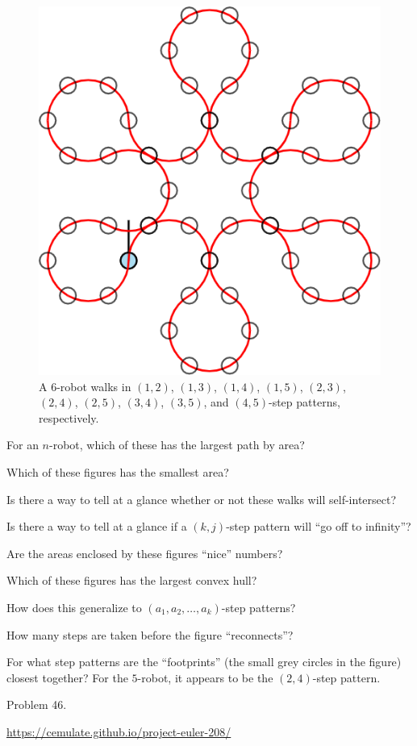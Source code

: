 \documentclass{article}
\begin{document}
\begin{figure}[ht!]
  \includegraphics[scale=0.12]{assets/robot_walks/079_problem_6-robot_4_5.png}
  \caption{
    A $6$-robot walks in $(1,2)$, $(1,3)$, $(1,4)$, $(1,5)$, $(2,3)$,
    $(2,4)$, $(2,5)$, $(3,4)$, $(3,5)$, and $(4,5)$-step patterns, respectively.
  }
\end{figure}
\begin{question}
  For an $n$-robot, which of these has the largest path by area?
\end{question}

\begin{related}
  \item Which of these figures has the smallest area?
  \item Is there a way to tell at a glance whether or not these walks will
    self-intersect?
  \item Is there a way to tell at a glance if a $(k,j)$-step pattern will
    ``go off to infinity''?
  \item Are the areas enclosed by these figures ``nice'' numbers?
  \item Which of these figures has the largest convex hull?
  \item How does this generalize to $(a_1, a_2, \hdots, a_k)$-step patterns?
  \item How many steps are taken before the figure ``reconnects''?
  \item For what step patterns are the ``footprints''
    (the small grey circles in the figure) closest together?
    For the $5$-robot, it appears to be the $(2, 4)$-step pattern.
\end{related}
\begin{references}
  \item Problem 46.
  \item \url{https://cemulate.github.io/project-euler-208/}
\end{references}
\end{document}
